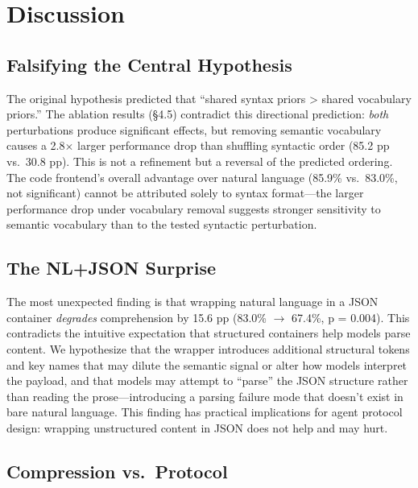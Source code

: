 \documentclass{article}
\begin{document}
\section{Discussion}\label{discussion}



\subsection{Falsifying the Central Hypothesis}\label{falsifying-the-central-hypothesis}



The original hypothesis predicted that ``shared syntax priors > shared vocabulary priors.'' The ablation results (\S4.5) contradict this directional prediction: \emph{both} perturbations produce significant effects, but removing semantic vocabulary causes a 2.8$\times$ larger performance drop than shuffling syntactic order (85.2 pp vs.~30.8 pp). This is not a refinement but a reversal of the predicted ordering. The code frontend's overall advantage over natural language (85.9\% vs.~83.0\%, not significant) cannot be attributed solely to syntax format---the larger performance drop under vocabulary removal suggests stronger sensitivity to semantic vocabulary than to the tested syntactic perturbation.



\subsection{The NL+JSON Surprise}\label{the-nljson-surprise}



The most unexpected finding is that wrapping natural language in a JSON container \emph{degrades} comprehension by 15.6 pp (83.0\% $\to$ 67.4\%, p = 0.004). This contradicts the intuitive expectation that structured containers help models parse content. We hypothesize that the wrapper introduces additional structural tokens and key names that may dilute the semantic signal or alter how models interpret the payload, and that models may attempt to ``parse'' the JSON structure rather than reading the prose---introducing a parsing failure mode that doesn't exist in bare natural language. This finding has practical implications for agent protocol design: wrapping unstructured content in JSON does not help and may hurt.



\subsection{Compression vs.~Protocol}\label{compression-vs.-protocol}
\end{document}
